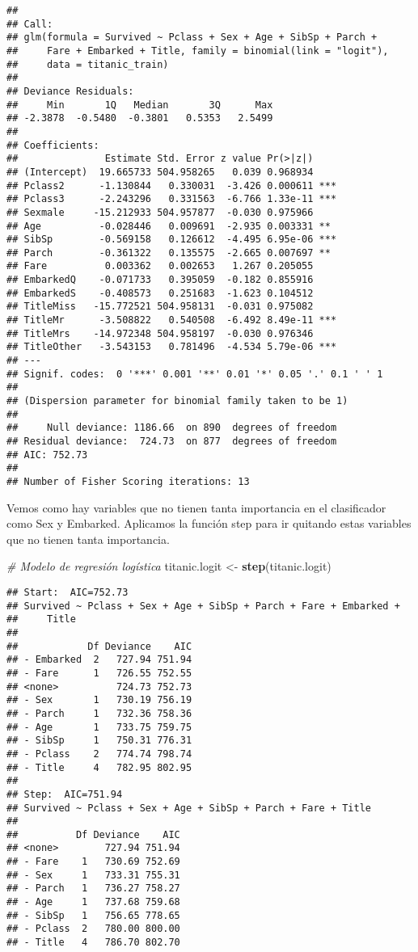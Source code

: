 \documentclass[]{article}
\newenvironment{Shaded}{\begin{snugshade}}{\end{snugshade}}
\newcommand{\KeywordTok}[1]{\textcolor[rgb]{0.13,0.29,0.53}{\textbf{#1}}}
\newcommand{\StringTok}[1]{\textcolor[rgb]{0.31,0.60,0.02}{#1}}
\newcommand{\CommentTok}[1]{\textcolor[rgb]{0.56,0.35,0.01}{\textit{#1}}}
\newcommand{\NormalTok}[1]{#1}
\begin{document}
\begin{verbatim}
## 
## Call:
## glm(formula = Survived ~ Pclass + Sex + Age + SibSp + Parch + 
##     Fare + Embarked + Title, family = binomial(link = "logit"), 
##     data = titanic_train)
## 
## Deviance Residuals: 
##     Min       1Q   Median       3Q      Max  
## -2.3878  -0.5480  -0.3801   0.5353   2.5499  
## 
## Coefficients:
##               Estimate Std. Error z value Pr(>|z|)    
## (Intercept)  19.665733 504.958265   0.039 0.968934    
## Pclass2      -1.130844   0.330031  -3.426 0.000611 ***
## Pclass3      -2.243296   0.331563  -6.766 1.33e-11 ***
## Sexmale     -15.212933 504.957877  -0.030 0.975966    
## Age          -0.028446   0.009691  -2.935 0.003331 ** 
## SibSp        -0.569158   0.126612  -4.495 6.95e-06 ***
## Parch        -0.361322   0.135575  -2.665 0.007697 ** 
## Fare          0.003362   0.002653   1.267 0.205055    
## EmbarkedQ    -0.071733   0.395059  -0.182 0.855916    
## EmbarkedS    -0.408573   0.251683  -1.623 0.104512    
## TitleMiss   -15.772521 504.958131  -0.031 0.975082    
## TitleMr      -3.508822   0.540508  -6.492 8.49e-11 ***
## TitleMrs    -14.972348 504.958197  -0.030 0.976346    
## TitleOther   -3.543153   0.781496  -4.534 5.79e-06 ***
## ---
## Signif. codes:  0 '***' 0.001 '**' 0.01 '*' 0.05 '.' 0.1 ' ' 1
## 
## (Dispersion parameter for binomial family taken to be 1)
## 
##     Null deviance: 1186.66  on 890  degrees of freedom
## Residual deviance:  724.73  on 877  degrees of freedom
## AIC: 752.73
## 
## Number of Fisher Scoring iterations: 13
\end{verbatim}

Vemos como hay variables que no tienen tanta importancia en el
clasificador como Sex y Embarked. Aplicamos la función step para ir
quitando estas variables que no tienen tanta importancia.

\begin{Shaded}
\begin{Highlighting}[]
\CommentTok{# Modelo de regresión logística}
\NormalTok{titanic.logit <-}\StringTok{ }\KeywordTok{step}\NormalTok{(titanic.logit)}
\end{Highlighting}
\end{Shaded}

\begin{verbatim}
## Start:  AIC=752.73
## Survived ~ Pclass + Sex + Age + SibSp + Parch + Fare + Embarked + 
##     Title
## 
##            Df Deviance    AIC
## - Embarked  2   727.94 751.94
## - Fare      1   726.55 752.55
## <none>          724.73 752.73
## - Sex       1   730.19 756.19
## - Parch     1   732.36 758.36
## - Age       1   733.75 759.75
## - SibSp     1   750.31 776.31
## - Pclass    2   774.74 798.74
## - Title     4   782.95 802.95
## 
## Step:  AIC=751.94
## Survived ~ Pclass + Sex + Age + SibSp + Parch + Fare + Title
## 
##          Df Deviance    AIC
## <none>        727.94 751.94
## - Fare    1   730.69 752.69
## - Sex     1   733.31 755.31
## - Parch   1   736.27 758.27
## - Age     1   737.68 759.68
## - SibSp   1   756.65 778.65
## - Pclass  2   780.00 800.00
## - Title   4   786.70 802.70
\end{verbatim}
\end{document}
